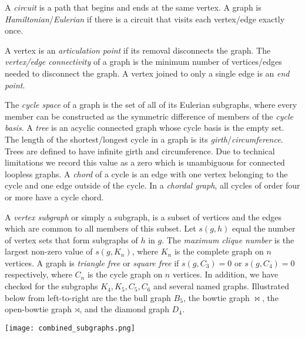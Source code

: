 \documentclass[12pt]{article}
\newcommand{\VARsubgraph}{s}
\newcommand{\subgraphBULL}{B_5}
\newcommand{\subgraphDIAMOND}{D_4}
\newcommand{\subgraphBOWTIE}{\bowtie}
\newcommand{\subgraphOPENBOWTIE}{\rtimes}
\begin{document}
\begin{appendices}
A \textit{circuit} is a path that begins and ends at the same vertex.
A graph is \textit{Hamiltonian}/\textit{Eulerian} if there is a circuit that visits each vertex/edge exactly once.

A vertex is an \textit{articulation point} if its removal disconnects the graph. 
The \textit{vertex/edge connectivity} of a graph is the minimum number of vertices/edges needed to disconnect the graph.
A vertex joined to only a single edge is an \textit{end point}.

The \textit{cycle space} of a graph is the set of all of its Eulerian subgraphs, where every member can be constructed as the symmetric difference of members of the \textit{cycle basis}. 
A \textit{tree} is an acyclic connected graph whose cycle basis is the empty set.
The length of the shortest/longest cycle in a graph is its \textit{girth}/\textit{circumference}.
Trees are defined to have infinite girth and circumference.
Due to technical limitations we record this value as a zero which is unambiguous for connected loopless graphs.
A \textit{chord} of a cycle is an edge with one vertex belonging to the cycle and one edge outside of the cycle.
In a \textit{chordal graph}, all cycles of order four or more have a cycle chord.   
 
A \textit{vertex subgraph} or simply a subgraph, is a subset of vertices and the edges which are common to all members of this subset. 
Let $\VARsubgraph(g,h)$ equal the number of vertex sets that form subgraphs of $h$ in $g$.
The \textit{maximum clique number} is the largest non-zero value of $\VARsubgraph(g, K_n)$, where $K_n$ is the complete graph on $n$ vertices. 
A graph is \textit{triangle free} or \textit{square free} if $\VARsubgraph(g,C_3)=0$ or $\VARsubgraph(g,C_4)=0$ respectively, where $C_n$ is the cycle graph on $n$ vertices.
In addition, we have checked for the subgraphs $K_4, K_5, C_5, C_6$ and several named graphs.
Illustrated below from left-to-right are the 
the bull graph $\subgraphBULL{}$,
the bowtie graph $\subgraphBOWTIE{}$, 
the open-bowtie graph $\subgraphOPENBOWTIE{}$,
and the diamond graph $\subgraphDIAMOND{}$.
%
\begin{center}
  \texttt{[image: combined\_subgraphs.png]}
\end{center}



\end{appendices}
\end{document}
